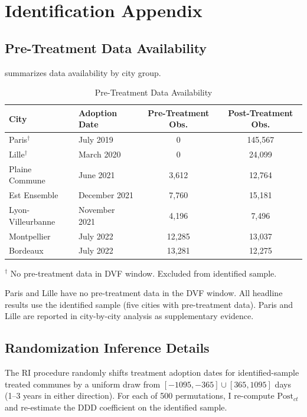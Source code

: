 \documentclass[12pt]{article}
\begin{document}
\section{Identification Appendix}
\label{app:identification}

\subsection{Pre-Treatment Data Availability}

 summarizes data availability by city group.

\begin{table}[H]
\centering
\caption{Pre-Treatment Data Availability}
\label{tab:predata}
\begin{tabular}{llcc}
\toprule
City & Adoption Date & Pre-Treatment Obs. & Post-Treatment Obs. \\
\midrule
Paris$^\dagger$ & July 2019 & 0 & 145,567 \\
Lille$^\dagger$ & March 2020 & 0 & 24,099 \\
Plaine Commune & June 2021 & 3,612 & 12,764 \\
Est Ensemble & December 2021 & 7,760 & 15,181 \\
Lyon-Villeurbanne & November 2021 & 4,196 & 7,496 \\
Montpellier & July 2022 & 12,285 & 13,037 \\
Bordeaux & July 2022 & 13,281 & 12,275 \\
\bottomrule
\end{tabular}
\vspace{0.3em}
{\small $^\dagger$ No pre-treatment data in DVF window. Excluded from identified sample.}
\end{table}

Paris and Lille have no pre-treatment data in the DVF window. All headline results use the identified sample (five cities with pre-treatment data). Paris and Lille are reported in city-by-city analysis as supplementary evidence.

\subsection{Randomization Inference Details}

The RI procedure randomly shifts treatment adoption dates for identified-sample treated communes by a uniform draw from $[-1095, -365] \cup [365, 1095]$ days (1--3 years in either direction). For each of 500 permutations, I re-compute $\text{Post}_{ct}$ and re-estimate the DDD coefficient on the identified sample.
\end{document}
